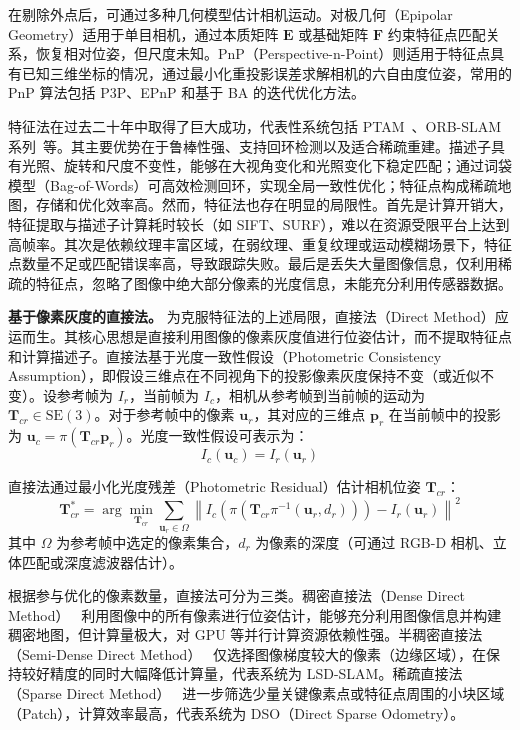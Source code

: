在剔除外点后，可通过多种几何模型估计相机运动。对极几何（Epipolar Geometry）适用于单目相机，通过本质矩阵 $\mathbf{E}$ 或基础矩阵 $\mathbf{F}$ 约束特征点匹配关系，恢复相对位姿，但尺度未知。PnP（Perspective-n-Point）则适用于特征点具有已知三维坐标的情况，通过最小化重投影误差求解相机的六自由度位姿，常用的 PnP 算法包括 P3P、EPnP 和基于 BA 的迭代优化方法。

特征法在过去二十年中取得了巨大成功，代表性系统包括 PTAM~\cite{klein2007parallel}、ORB-SLAM 系列~\cite{mur2015orb,mur2017orb}等。其主要优势在于鲁棒性强、支持回环检测以及适合稀疏重建。描述子具有光照、旋转和尺度不变性，能够在大视角变化和光照变化下稳定匹配；通过词袋模型（Bag-of-Words）可高效检测回环，实现全局一致性优化；特征点构成稀疏地图，存储和优化效率高。然而，特征法也存在明显的局限性。首先是计算开销大，特征提取与描述子计算耗时较长（如 SIFT、SURF），难以在资源受限平台上达到高帧率。其次是依赖纹理丰富区域，在弱纹理、重复纹理或运动模糊场景下，特征点数量不足或匹配错误率高，导致跟踪失败。最后是丢失大量图像信息，仅利用稀疏的特征点，忽略了图像中绝大部分像素的光度信息，未能充分利用传感器数据。

\textbf{基于像素灰度的直接法。}
为克服特征法的上述局限，直接法（Direct Method）应运而生。其核心思想是直接利用图像的像素灰度值进行位姿估计，而不提取特征点和计算描述子。直接法基于光度一致性假设（Photometric Consistency Assumption），即假设三维点在不同视角下的投影像素灰度保持不变（或近似不变）。设参考帧为 $I_r$，当前帧为 $I_c$，相机从参考帧到当前帧的运动为 $\mathbf{T}_{cr} \in \text{SE}(3)$。对于参考帧中的像素 $\mathbf{u}_r$，其对应的三维点 $\mathbf{p}_r$ 在当前帧中的投影为 $\mathbf{u}_c = \pi(\mathbf{T}_{cr} \mathbf{p}_r)$。光度一致性假设可表示为：
\begin{equation}
    I_c(\mathbf{u}_c) = I_r(\mathbf{u}_r)
\end{equation}

直接法通过最小化光度残差（Photometric Residual）估计相机位姿 $\mathbf{T}_{cr}$：
\begin{equation}
    \mathbf{T}_{cr}^* = \arg\min_{\mathbf{T}_{cr}} \sum_{\mathbf{u}_r \in \Omega} \left\| I_c\left(\pi(\mathbf{T}_{cr} \pi^{-1}(\mathbf{u}_r, d_r))\right) - I_r(\mathbf{u}_r) \right\|^2
\end{equation}
其中 $\Omega$ 为参考帧中选定的像素集合，$d_r$ 为像素的深度（可通过 RGB-D 相机、立体匹配或深度滤波器估计）。

根据参与优化的像素数量，直接法可分为三类。稠密直接法（Dense Direct Method）~\cite{newcombe2011dtam} 利用图像中的所有像素进行位姿估计，能够充分利用图像信息并构建稠密地图，但计算量极大，对 GPU 等并行计算资源依赖性强。半稠密直接法（Semi-Dense Direct Method）~\cite{engel2014lsd} 仅选择图像梯度较大的像素（边缘区域），在保持较好精度的同时大幅降低计算量，代表系统为 LSD-SLAM。稀疏直接法（Sparse Direct Method）~\cite{engel2017direct} 进一步筛选少量关键像素点或特征点周围的小块区域（Patch），计算效率最高，代表系统为 DSO（Direct Sparse Odometry）。

